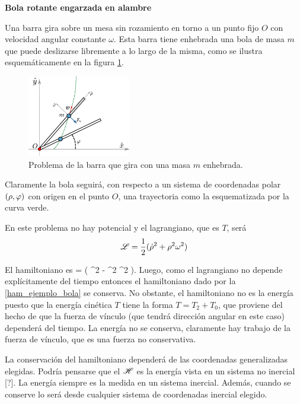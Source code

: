 \documentclass[10pt,oneside]{CBFT_book}
\begin{document}
\begin{ejemplo}{\bf Bola rotante engarzada en alambre}

Una barra gira sobre un mesa sin rozamiento en torno a un punto fijo $O$ con velocidad angular constante $ \omega $.
Esta barra tiene enhebrada una bola de masa $m$ que puede deslizarse libremente a lo largo de la misma, como se ilustra 
esquemáticamente en la figura \ref{fig_barra_giratoria}.

\begin{figure}[bth]
	\begin{center}
	\includegraphics[width=0.4\textwidth]{images/fig_barra_giratoria.pdf}
	\end{center}
	\caption{Problema de la barra que gira con una masa $m$ enhebrada.}
	\label{fig_barra_giratoria}
\end{figure} 

Claramente la bola seguirá, con respecto a un sistema de coordenadas polar $(\rho,\varphi)$ con origen en el punto $O$,
una trayectoria como la esquematizada por la curva verde. 

En este problema no hay potencial y el lagrangiano, que es $T$, será 
\[
	\mathscr{L} = \frac{1}{2} ( \dot{\rho}^2 + \rho^2 \omega^2 )
\]

El hamiltoniano es 
\be
	\Ham =  ( \dot{\rho}^2 - \rho^2 \omega^2 ).
	\label{ham_ejemplo_bola}
\ee
Luego, como el lagrangiano no depende explícitamente del tiempo entonces el hamiltoniano dado por la \eqref{ham_ejemplo_bola}
se conserva. No obstante, el hamiltoniano no es la energía puesto que la energía cinética $ T $ tiene la forma  $ T = T_2 + T_0 $,
que proviene del hecho de que la fuerza de vínculo (que tendrá dirección angular en este caso) dependerá del tiempo.
La energía no se conserva, claramente hay trabajo de la fuerza de vínculo, que es una fuerza no conservativa. 

La conservación del hamiltoniano dependerá de las coordenadas generalizadas elegidas. Podría pensarse que el $\mathscr{H}$ es la energía
vista en un sistema no inercial [?].
La energía siempre es la medida en un sistema inercial. Además, cuando se conserve lo será desde cualquier sistema de coordenadas
inercial elegido.
 
\end{ejemplo}
\end{document}
